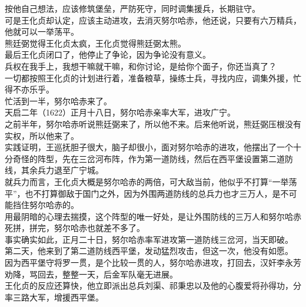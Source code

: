 \begin{multicols}{\theparacolNo}
按他自己想法，应该修筑堡垒，严防死守，同时调集援兵，长期驻守。\\

可是王化贞却认定，应该主动进攻，去消灭努尔哈赤，他还说，只要有六万精兵，他就可以一举荡平。\\

熊廷弼觉得王化贞太疯，王化贞觉得熊廷弼太熊。\\

最后王化贞闭口了，他停止了争论，因为争论没有意义。\\

兵权在我手上，我想干嘛就干嘛，和你讨论，是给你个面子，你还当真了？\\

一切都按照王化贞的计划进行着，准备粮草，操练士兵，寻找内应，调集外援，忙得不亦乐乎。\\

忙活到一半，努尔哈赤来了。\\

天启二年（1622）正月十八日，努尔哈赤亲率大军，进攻广宁。\\

之前半年，努尔哈赤听说熊廷弼来了，所以他不来。后来他听说，熊廷弼压根没有实权，所以他来了。\\

实践证明，王巡抚胆子很大，脑子却很小，面对努尔哈赤的进攻，他摆出了一个十分奇怪的阵型，先在三岔河布阵，作为第一道防线，然后在西平堡设置第二道防线，其余兵力退至广宁城。\\

就兵力而言，王化贞大概是努尔哈赤的两倍，可大敌当前，他似乎不打算“一举荡平”，也不打算御敌于国门之外，因为外围两道防线的总兵力也才三万人，是不可能挡住努尔哈赤的。\\

用最阴暗的心理去揣摸，这个阵型的唯一好处，是让外围防线的三万人和努尔哈赤死拼，拼完，努尔哈赤也就差不多了。\\

事实确实如此，正月二十日，努尔哈赤率军进攻第一道防线三岔河，当天即破。\\

第二天，他来到了第二道防线西平堡，发动猛烈攻击，但这一次，他没有如愿。\\

因为西平堡守将罗一贯，是个比较一贯的人，努尔哈赤进攻，打回去，汉奸李永芳劝降，骂回去，整整一天，后金军队毫无进展。\\

王化贞的反应还算快，他立即派出总兵刘渠、祁秉忠以及他的心腹爱将孙得功，分率三路大军，增援西平堡。\\


\end{multicols}
